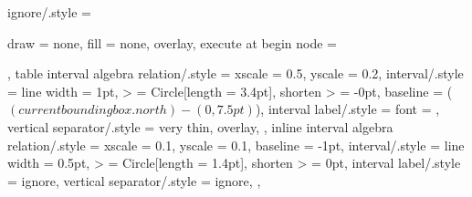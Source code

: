 \newcommand*{\DrawAxes}[2] %
{
\pgfmathsetmacro{\MaxX}{#1}
\pgfmathsetmacro{\MaxY}{#2}

\DrawXAxis{\MaxX}{\MaxY}{0}

\begin{pgfonlayer}{grid}
    \foreach \y in {1, ..., \MaxY}
    \draw [grid] (0, \y) -- +(\MaxX, 0);
\end{pgfonlayer}

\begin{pgfonlayer}{axes}
    \draw[axis, ->] (0, 0) -- (0, \MaxY) node [y axis label] {$A$} ;
    \pgfmathparse{\MaxY - 1}
    \foreach \y in {0, ..., \pgfmathresult}
    {
    \draw[axis tick] (-0.1, \y) -- (0.1, \y);
    \node[axis tick label, anchor = east] at (0, \y) {\y};
    }
\end{pgfonlayer}
}




\newcommand*{\DrawTuple}[5][tuple] %
{
    \begin{pgfonlayer}{tuples}
        \draw[#1] (#2, #4) -- (#3, #4) node [tuple label] {#5};
    \end{pgfonlayer}
}



\newcommand*{\DrawRTuple}{}
\newcommand*{\ResetDrawRTuple}{
    \renewcommand*{\DrawRTuple}[4]{\DrawTuple{##1}{##2}{##3}{##4}}
}
\ResetDrawRTuple



\newcommand*{\DrawISEQLExampleRelations}
{
    \DrawXAxis{8}{7}{3}

    \DrawRTuple{0}{1}{5}{$r_1$}
    \DrawRTuple{1}{3}{6}{$r_2$}
    \DrawRTuple{2}{5}{4}{$r_3$}

    \DrawTuple{1}{3}{2}{$s_1$}
    \DrawTuple{3}{4}{1}{$s_2$}
}




\newsavebox{\IgnoreBox}
\tikzset
{
    ignore/.style = %
    {
        draw = none,
        fill = none,
        overlay,
        execute at begin node = {\begin{lrbox}{\IgnoreBox}},
        execute at end node = {\end{lrbox}}
    },
    table interval algebra relation/.style =
    {
        xscale = 0.5,
        yscale = 0.2,
        interval/.style = {line width = 1pt, > = {Circle[length = 3.4pt]},
            shorten > = -0pt},
        baseline = {($(current bounding box.north) - (0,7.5pt)$)},
        interval label/.style = {font = {\small}},
        vertical separator/.style = {very thin, overlay},
    },
    inline interval algebra relation/.style =
    {
        xscale = 0.1,
        yscale = 0.1,
        baseline = -1pt,
        interval/.style = {line width = 0.5pt, > = {Circle[length = 1.4pt]},
            shorten > = 0pt},
        interval label/.style = {ignore},
        vertical separator/.style = {ignore},
    },
}


